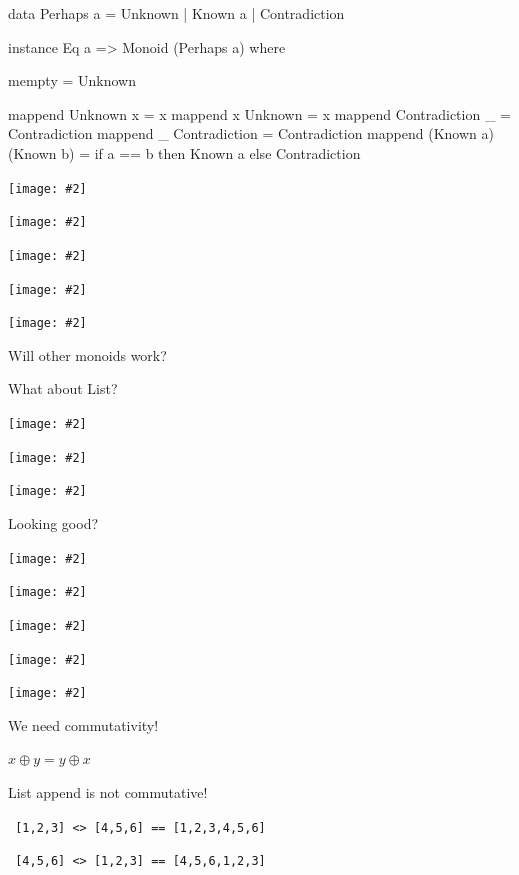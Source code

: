 \documentclass[usenames,dvipsnames,svgnames,table,aspectratio=1610,mathserif]{beamer}
\newcommand{\nl}{\vspace{\baselineskip}}
\newcommand{\pnl}{\pause \nl}
\newcommand{\textslide}[1]{{
\begin{frame}
\begin{center}

#1

\end{center}
\end{frame}
}}
\newcommand{\imageslide}[2][1]{{
\begin{frame}\begin{center}
\texttt{[image: \#2]}
\end{center}\end{frame}
}}
\newcommand{\imageslideleft}[2][1]{{
\begin{frame}
\texttt{[image: \#2]}
\end{frame}
}}
\begin{document}


\begin{frame}[fragile]

\begin{haskellcode}
data Perhaps a = Unknown | Known a | Contradiction
\end{haskellcode}

\pnl

\begin{haskellcode}
instance Eq a => Monoid (Perhaps a) where

  mempty = Unknown

  mappend Unknown x           = x
  mappend x       Unknown     = x
  mappend Contradiction _     = Contradiction
  mappend _     Contradiction = Contradiction
  mappend (Known a) (Known b) =
    if a == b
      then Known a
      else Contradiction
\end{haskellcode}

\end{frame}



\imageslide[0.6]{diagrams/doubleplus4.pdf}
\imageslide[0.6]{diagrams/doubleplus5.pdf}
\imageslide[0.6]{diagrams/doubleplus6.pdf}
\imageslide[0.6]{diagrams/doubleplus7.pdf}
\imageslide[0.6]{diagrams/doubleplus8.pdf}

\textslide{
\LARGE{Will other monoids work?}

\pnl

\Large{What about List?}
}

\imageslide[0.6]{diagrams/doubleplus9.pdf}
\imageslide[0.6]{diagrams/doubleplus10.pdf}
\imageslide[0.6]{diagrams/doubleplus11.pdf}
\textslide{\Large{Looking good?}}
\imageslide[0.6]{diagrams/doubleplus12.pdf}
\imageslide[0.6]{diagrams/doubleplus13.pdf}
\imageslide[0.6]{diagrams/doubleplus14.pdf}
\imageslide[0.6]{diagrams/doubleplus11.pdf}
\imageslide[0.6]{diagrams/doubleplus14.pdf}


\begin{frame}[fragile]
\begin{center}
\Large{
  We need commutativity!

  \nl

  $x \oplus y = y \oplus x$

  \pnl

  List append is not commutative!

  {\tt {
    [1,2,3] <> [4,5,6] == [1,2,3,4,5,6]
  }}

  {\tt {
    [4,5,6] <> [1,2,3] == [4,5,6,1,2,3]
  }}
}
\end{center}
\end{frame}
\end{document}
